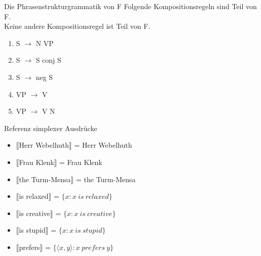 \begin{frame}
  {Die Phrasenstrukturgrammatik von F}
  \onslide<+->
  \onslide<+->
  Folgende Kompositionsregeln sind Teil von F.\\
  Keine andere Kompositionsregel ist Teil von F.\\
  \Halbzeile
  \begin{enumerate}[<+->]
    \item S $\rightarrow$ N VP \label{syn01}
    \item S $\rightarrow$ S conj S \label{syn02}
    \item S $\rightarrow$ neg S \label{syn03}
    \item VP $\rightarrow$ V \label{syn04}
    \item VP $\rightarrow$ V N \label{syn05}
  \end{enumerate}
\end{frame}

\begin{frame}
  {Referenz simplexer Ausdrücke}
  \begin{itemize}[<+->]
    \item $\llbracket$Herr Webelhuth$\rrbracket$ = Herr Webelhuth \label{lexint01}
    \item $\llbracket$Frau Klenk$\rrbracket$ = Frau Klenk \label{lexint02}
    \item $\llbracket$the Turm-Mensa$\rrbracket$ = the Turm-Mensa \label{lexint03}
    \item $\llbracket$is relaxed$\rrbracket$ = $\{x:x\ is\ relaxed\}$ \label{lexint04}
    \item $\llbracket$is creative$\rrbracket$ = $\{x:x\ is\ creative\}$ \label{lexint05}
    \item $\llbracket$is stupid$\rrbracket$ = $\{x:x\ is\ stupid\}$ \label{lexint06}
    \item $\llbracket$prefers$\rrbracket$ = $\{\langle x,y\rangle: x\ prefers\ y\}$ \label{lexint07}
  \end{itemize}
\end{frame}

